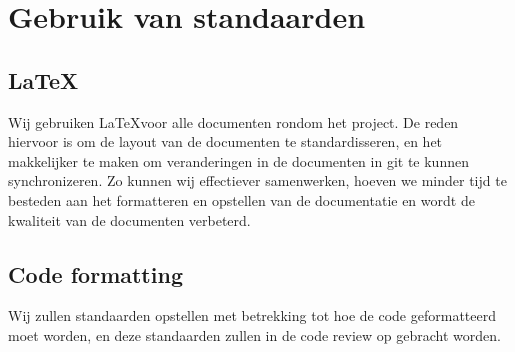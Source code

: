 \section{Gebruik van standaarden}
	\subsection{\LaTeX}
		Wij gebruiken \LaTeX voor alle documenten rondom het project.
		De reden hiervoor is om de layout van de documenten te standardisseren, en het makkelijker te maken om veranderingen in de documenten in git te kunnen synchronizeren.
		Zo kunnen wij effectiever samenwerken, hoeven we minder tijd te besteden aan het formatteren en opstellen van de documentatie en wordt de kwaliteit van de documenten verbeterd.
	\subsection{Code formatting}
		 Wij zullen standaarden opstellen met betrekking tot hoe de code geformatteerd moet worden, en deze standaarden zullen in de code review op gebracht worden.
